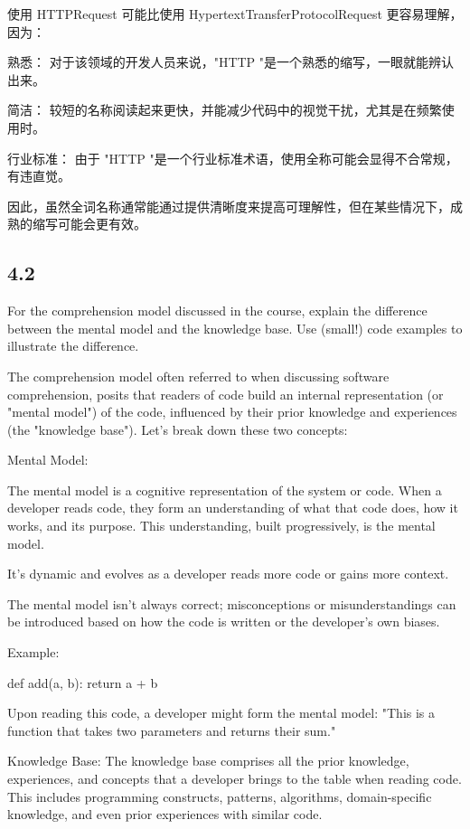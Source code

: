 使用 HTTPRequest 可能比使用 HypertextTransferProtocolRequest 更容易理解，因为：

熟悉： 对于该领域的开发人员来说，"HTTP "是一个熟悉的缩写，一眼就能辨认出来。

简洁： 较短的名称阅读起来更快，并能减少代码中的视觉干扰，尤其是在频繁使用时。

行业标准： 由于 "HTTP "是一个行业标准术语，使用全称可能会显得不合常规，有违直觉。

因此，虽然全词名称通常能通过提供清晰度来提高可理解性，但在某些情况下，成熟的缩写可能会更有效。

\subsection{4.2}
For the comprehension model discussed in the course, explain the difference between the mental model and the knowledge base. Use (small!) code examples to illustrate the difference.

The comprehension model often referred to when discussing software comprehension, posits that readers of code build an internal representation (or "mental model") of the code, influenced by their prior knowledge and experiences (the "knowledge base"). Let's break down these two concepts:

Mental Model:

The mental model is a cognitive representation of the system or code. When a developer reads code, they form an understanding of what that code does, how it works, and its purpose. This understanding, built progressively, is the mental model.

It's dynamic and evolves as a developer reads more code or gains more context.

The mental model isn't always correct; misconceptions or misunderstandings can be introduced based on how the code is written or the developer's own biases.

Example:

def add(a, b):
return a + b

Upon reading this code, a developer might form the mental model: "This is a function that takes two parameters and returns their sum."

Knowledge Base:
The knowledge base comprises all the prior knowledge, experiences, and concepts that a developer brings to the table when reading code. This includes programming constructs, patterns, algorithms, domain-specific knowledge, and even prior experiences with similar code.

